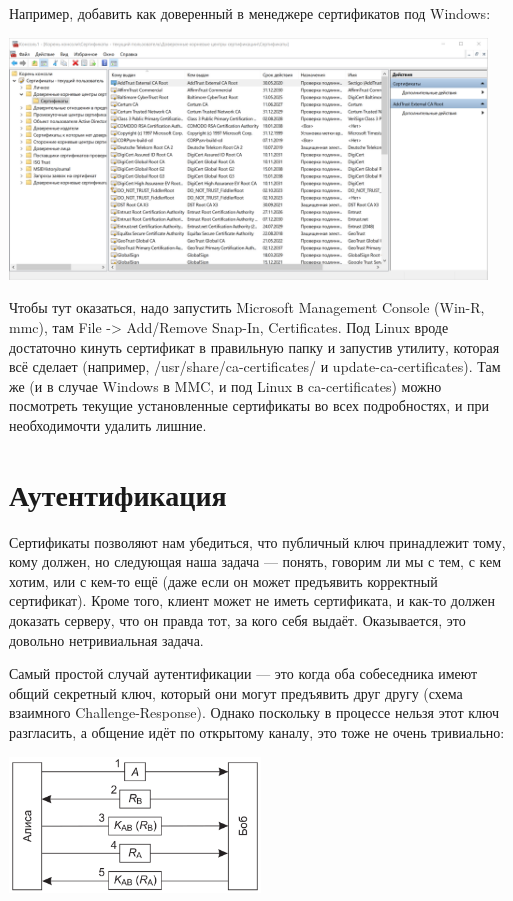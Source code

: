 \documentclass{../../text-style}
\begin{document}
Например, добавить как доверенный в менеджере сертификатов под Windows:

\begin{center}
    \includegraphics[width=0.95\textwidth]{windowsCertManager.png}
\end{center}

Чтобы тут оказаться, надо запустить Microsoft Management Console (Win-R, mmc), там File -> Add/Remove Snap-In, Certificates. Под Linux вроде достаточно кинуть сертификат в правильную папку и запустив утилиту, которая всё сделает (например, /usr/share/ca-certificates/ и update-ca-certificates). Там же (и в случае Windows в MMC, и под Linux в ca-certificates) можно посмотреть текущие установленные сертификаты во всех подробностях, и при необходимочти удалить лишние.

\section{Аутентификация}

Сертификаты позволяют нам убедиться, что публичный ключ принадлежит тому, кому должен, но следующая наша задача --- понять, говорим ли мы с тем, с кем хотим, или с кем-то ещё (даже если он может предъявить корректный сертификат). Кроме того, клиент может не иметь сертификата, и как-то должен доказать серверу, что он правда тот, за кого себя выдаёт. Оказывается, это довольно нетривиальная задача.

Самый простой случай аутентификации --- это когда оба собеседника имеют общий секретный ключ, который они могут предъявить друг другу (схема взаимного Challenge-Response). Однако поскольку в процессе нельзя этот ключ разгласить, а общение идёт по открытому каналу, это тоже не очень тривиально:

\begin{center}
    \includegraphics[width=0.5\textwidth]{challengeResponse.png}
\end{center}
\end{document}

